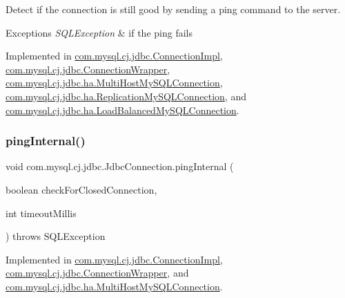Detect if the connection is still good by sending a ping command to the server.


\begin{DoxyExceptions}{Exceptions}
{\em S\+Q\+L\+Exception} & if the ping fails \\
\hline
\end{DoxyExceptions}


Implemented in \mbox{\hyperlink{classcom_1_1mysql_1_1cj_1_1jdbc_1_1_connection_impl_a790847769075cca4f1f42d47b864f3e3}{com.\+mysql.\+cj.\+jdbc.\+Connection\+Impl}}, \mbox{\hyperlink{classcom_1_1mysql_1_1cj_1_1jdbc_1_1_connection_wrapper_af9d635c00b09fc14bff63eeeec9b354d}{com.\+mysql.\+cj.\+jdbc.\+Connection\+Wrapper}}, \mbox{\hyperlink{classcom_1_1mysql_1_1cj_1_1jdbc_1_1ha_1_1_multi_host_my_s_q_l_connection_a75f3a66c04a2960e920a6e57a3279556}{com.\+mysql.\+cj.\+jdbc.\+ha.\+Multi\+Host\+My\+S\+Q\+L\+Connection}}, \mbox{\hyperlink{classcom_1_1mysql_1_1cj_1_1jdbc_1_1ha_1_1_replication_my_s_q_l_connection_a87a413280dac1e1f0be1bd8c93420082}{com.\+mysql.\+cj.\+jdbc.\+ha.\+Replication\+My\+S\+Q\+L\+Connection}}, and \mbox{\hyperlink{classcom_1_1mysql_1_1cj_1_1jdbc_1_1ha_1_1_load_balanced_my_s_q_l_connection_a58a06fe0caa8144988fb2464d9fc4b0a}{com.\+mysql.\+cj.\+jdbc.\+ha.\+Load\+Balanced\+My\+S\+Q\+L\+Connection}}.

\mbox{\label{interfacecom_1_1mysql_1_1cj_1_1jdbc_1_1_jdbc_connection_a25615f355be83a136df2efcde168666c}} 
\subsubsection{\texorpdfstring{ping\+Internal()}{pingInternal()}}
{\footnotesize\ttfamily void com.\+mysql.\+cj.\+jdbc.\+Jdbc\+Connection.\+ping\+Internal (\begin{DoxyParamCaption}\item[{boolean}]{check\+For\+Closed\+Connection,  }\item[{int}]{timeout\+Millis }\end{DoxyParamCaption}) throws S\+Q\+L\+Exception}



Implemented in \mbox{\hyperlink{classcom_1_1mysql_1_1cj_1_1jdbc_1_1_connection_impl_a7da1e11bed26e0346d29c166fc99b133}{com.\+mysql.\+cj.\+jdbc.\+Connection\+Impl}}, \mbox{\hyperlink{classcom_1_1mysql_1_1cj_1_1jdbc_1_1_connection_wrapper_a352f4c8ac35df8c04b0cbbe68173b71e}{com.\+mysql.\+cj.\+jdbc.\+Connection\+Wrapper}}, and \mbox{\hyperlink{classcom_1_1mysql_1_1cj_1_1jdbc_1_1ha_1_1_multi_host_my_s_q_l_connection_a491d262b3c772b5b3f9763a82119afed}{com.\+mysql.\+cj.\+jdbc.\+ha.\+Multi\+Host\+My\+S\+Q\+L\+Connection}}.

